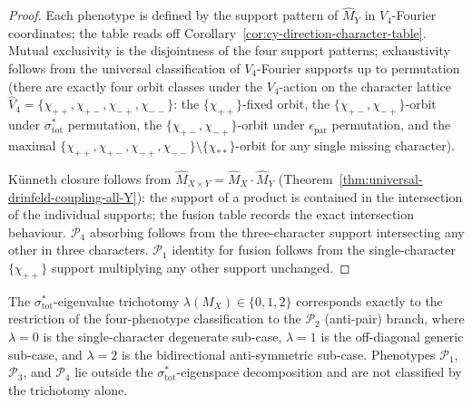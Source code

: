 \begin{proof}
Each phenotype is defined by the support pattern of $\hat{M}_Y$ in
$V_4$-Fourier coordinates; the table reads off
Corollary~\ref{cor:cy-direction-character-table}. Mutual exclusivity is
the disjointness of the four support patterns; exhaustivity follows from
the universal classification of $V_4$-Fourier supports up to permutation
\textup{(}there are exactly four orbit classes under the $V_4$-action on
the character lattice $\hat{V}_4 = \{\chi_{++}, \chi_{+-}, \chi_{-+}, \chi_{--}\}$:
the $\{\chi_{++}\}$-fixed orbit, the $\{\chi_{+-}, \chi_{-+}\}$-orbit
under $\sigma_{\mathrm{tot}}^*$ permutation, the $\{\chi_{+-}, \chi_{-+}\}$-orbit
under $\epsilon_{\mathrm{par}}$ permutation, and the
maximal $\{ \chi_{++}, \chi_{+-}, \chi_{-+}, \chi_{--} \}\setminus\{\chi_{**}\}$-orbit
for any single missing character\textup{).}

Künneth closure follows from $\hat{M}_{X \times Y} = \hat{M}_X \cdot \hat{M}_Y$
\textup{(}Theorem~\ref{thm:universal-drinfeld-coupling-all-Y}\textup{):}
the support of a product is contained in the intersection of the
individual supports; the fusion table records the exact intersection
behaviour. $\mathcal{P}_4$ absorbing follows from the three-character
support intersecting any other in three characters. $\mathcal{P}_1$
identity for fusion follows from the single-character $\{\chi_{++}\}$
support multiplying any other support unchanged.
\end{proof}

\begin{corollary}
\label{cor:sigma-trichotomy-as-P2-restriction}
The $\sigma_{\mathrm{tot}}^*$-eigenvalue trichotomy
$\lambda(M_X) \in \{0, 1, 2\}$ corresponds exactly to the restriction of
the four-phenotype classification to the $\mathcal{P}_2$ \textup{(}anti-pair\textup{)}
branch, where $\lambda = 0$ is the single-character degenerate sub-case,
$\lambda = 1$ is the off-diagonal generic sub-case, and $\lambda = 2$
is the bidirectional anti-symmetric sub-case. Phenotypes
$\mathcal{P}_1$, $\mathcal{P}_3$, and $\mathcal{P}_4$ lie outside the
$\sigma_{\mathrm{tot}}^*$-eigenspace decomposition and are not classified
by the trichotomy alone.
\end{corollary}

